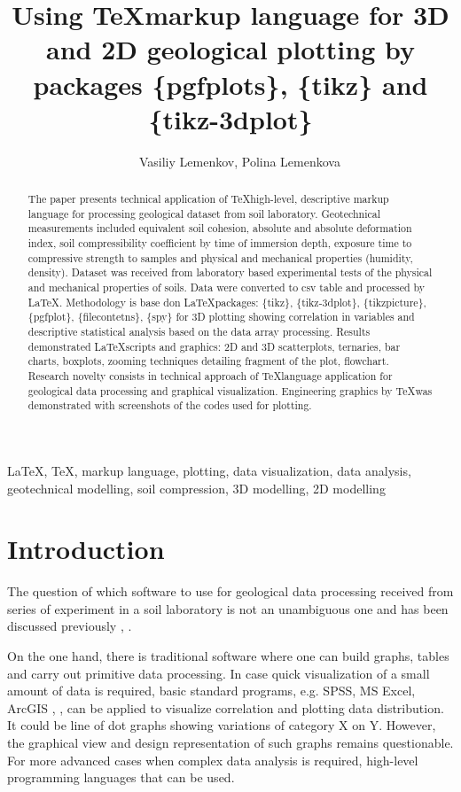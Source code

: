 \documentclass[a4paper,10pt]{article}
\date{}
\title{\textbf{Using \TeX \space markup language for 3D and 2D geological plotting by packages \{pgfplots\}, \{tikz\} and \{tikz-3dplot\} }}
\author{ $\,\,\,\,\,\,\,$ Vasiliy Lemenkov, Polina Lemenkova \address{Geoprojectsurvey LLC, Moscow, Russia and Ocean University of China, College of Marine Geo-sciences, Qingdao, China, \{wasiliy.lemenkov, pauline.lemenkova\}@gmail.com}}
\begin{document}
\maketitle

\begin{abstract}
The paper presents technical application of \TeX \space high-level, descriptive markup language for processing geological dataset from soil laboratory. Geotechnical measurements included equivalent soil cohesion, absolute and absolute deformation index, soil compressibility coefficient by time of immersion depth, exposure time to compressive strength to samples and physical and mechanical properties (humidity, density). Dataset was received from laboratory based experimental tests of the physical and mechanical properties of soils. Data were converted to csv table and processed by \LaTeX. Methodology is base don \LaTeX \space packages: \{tikz\}, \{tikz-3dplot\}, \{tikzpicture\}, \{pgfplot\}, \{filecontetns\}, \{spy\} for 3D plotting showing correlation in variables and descriptive statistical analysis based on the data array processing. Results demonstrated \LaTeX \space scripts and graphics: 2D and 3D scatterplots, ternaries, bar charts, boxplots, zooming techniques  detailing fragment of the plot, flowchart. Research novelty consists in technical approach of \TeX \space  language application for geological data processing and graphical visualization. Engineering graphics by \TeX \space was demonstrated with screenshots of the codes used for plotting. 
\end{abstract}

\begin{keywords}
\LaTeX, \TeX, markup language, plotting, data visualization, data analysis, geotechnical modelling, soil compression, 3D modelling, 2D modelling
\end{keywords}


\section{Introduction}

The question of which software to use for geological data processing received from series of experiment in a soil laboratory is not an unambiguous one and has been discussed previously \cite{DrielDavis1989}, \cite{DavisHerzfeld1993}. 

On the one hand, there is traditional software where one can build graphs, tables and carry out primitive data processing. In case quick visualization of a small amount of data is required, basic standard programs, e.g. SPSS, MS Excel, ArcGIS  \cite{Lemenkova201990}, \cite{Klaucoetal2013}, can be applied to visualize correlation and plotting data distribution. It could be line of dot graphs showing variations of category X on Y. However, the graphical view and design representation of such graphs remains questionable. For more advanced cases when complex data analysis is required, high-level programming languages that can be used. 
\end{document}
